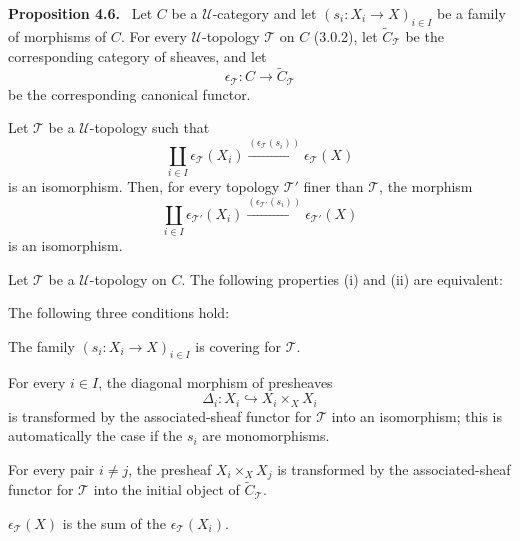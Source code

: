 \documentclass[11pt]{article}
\newcommand{\U}{\mathcal{U}}
\newenvironment{statement}[1]{\par\medskip\noindent\textbf{#1.}\ }{\par\medskip}
\begin{document}
\begin{statement}{Proposition 4.6}
Let \(C\) be a \(\U\)-category and let \((s_i:X_i\to X)_{i\in I}\) be a family of morphisms of \(C\). For every \(\U\)-topology \(\mathcal T\) on \(C\) (3.0.2), let \(\widetilde C_{\mathcal T}\) be the corresponding category of sheaves, and let
\[
\epsilon_{\mathcal T}:C\to\widetilde C_{\mathcal T}
\]
be the corresponding canonical functor.
\begin{enumerate}[label=\arabic*)]
\item Let \(\mathcal T\) be a \(\U\)-topology such that
\[
\coprod_{i\in I}\epsilon_{\mathcal T}(X_i)\xrightarrow{(\epsilon_{\mathcal T}(s_i))}\epsilon_{\mathcal T}(X)
\]
is an isomorphism. Then, for every topology \(\mathcal T'\) finer than \(\mathcal T\), the morphism
\[
\coprod_{i\in I}\epsilon_{\mathcal T'}(X_i)\xrightarrow{(\epsilon_{\mathcal T'}(s_i))}\epsilon_{\mathcal T'}(X)
\]
is an isomorphism.

\item Let \(\mathcal T\) be a \(\U\)-topology on \(C\). The following properties (i) and (ii) are equivalent:
\begin{description}[leftmargin=2.7em]
\item[(i)] The following three conditions hold:
\begin{description}[leftmargin=2.7em]
\item[(a)] The family \((s_i:X_i\to X)_{i\in I}\) is covering for \(\mathcal T\).
\item[(b)] For every \(i\in I\), the diagonal morphism of presheaves
\[
\Delta_i:X_i\hookrightarrow X_i\times_XX_i
\]
is transformed by the associated-sheaf functor for \(\mathcal T\) into an isomorphism; this is automatically the case if the \(s_i\) are monomorphisms.
\item[(c)] For every pair \(i\ne j\), the presheaf \(X_i\times_XX_j\) is transformed by the associated-sheaf functor for \(\mathcal T\) into the initial object of \(\widetilde C_{\mathcal T}\).
\end{description}
\item[(ii)] \(\epsilon_{\mathcal T}(X)\) is the sum of the \(\epsilon_{\mathcal T}(X_i)\).
\end{description}
\end{enumerate}
\end{statement}
\end{document}
